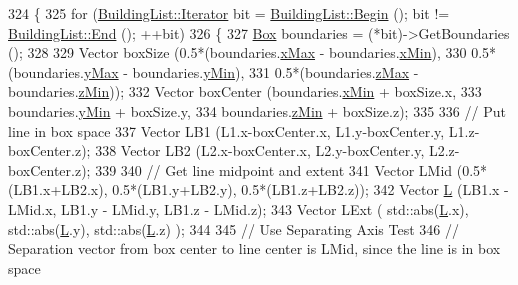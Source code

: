 \begin{DoxyCode}
324 \{
325         \textcolor{keywordflow}{for} (\hyperlink{classns3_1_1BuildingList_a84957ecea4b4343f676da0e96f2c8130}{BuildingList::Iterator} bit = 
      \hyperlink{classns3_1_1BuildingList_adbb122872e11541e930f0a3afa70a479}{BuildingList::Begin} (); bit != \hyperlink{classns3_1_1BuildingList_abc6b941dbb194efb9f00352cc6b3db65}{BuildingList::End} (); ++bit)
326         \{
327                 \hyperlink{classns3_1_1Box}{Box} boundaries = (*bit)->GetBoundaries ();
328 
329                 Vector boxSize (0.5*(boundaries.\hyperlink{classns3_1_1Box_a50021049c756e770329145b25d9533a2}{xMax} - boundaries.\hyperlink{classns3_1_1Box_a1fd6a43d53258323331d34da600ff1c5}{xMin}),
330                                 0.5*(boundaries.\hyperlink{classns3_1_1Box_a001fd430a14b19efe925c818a332e392}{yMax} - boundaries.\hyperlink{classns3_1_1Box_a3865ed092f941186823539c9979002f8}{yMin}),
331                                 0.5*(boundaries.\hyperlink{classns3_1_1Box_ae4d135764bbc8421fe82ec91e4693b59}{zMax} - boundaries.\hyperlink{classns3_1_1Box_a9ab297b877a5c31dbfb344bd6f027e91}{zMin}));
332                 Vector boxCenter (boundaries.\hyperlink{classns3_1_1Box_a1fd6a43d53258323331d34da600ff1c5}{xMin} + boxSize.x,
333                                 boundaries.\hyperlink{classns3_1_1Box_a3865ed092f941186823539c9979002f8}{yMin} + boxSize.y,
334                                 boundaries.\hyperlink{classns3_1_1Box_a9ab297b877a5c31dbfb344bd6f027e91}{zMin} + boxSize.z);
335 
336                 \textcolor{comment}{// Put line in box space}
337                 Vector LB1 (L1.x-boxCenter.x, L1.y-boxCenter.y, L1.z-boxCenter.z);
338                 Vector LB2 (L2.x-boxCenter.x, L2.y-boxCenter.y, L2.z-boxCenter.z);
339 
340                 \textcolor{comment}{// Get line midpoint and extent}
341                 Vector LMid (0.5*(LB1.x+LB2.x), 0.5*(LB1.y+LB2.y), 0.5*(LB1.z+LB2.z));
342                 Vector \hyperlink{loss__ITU1411__NLOS__over__rooftop_8m_a0f93e2c2e7c447b4dfc5bcac7e346da1}{L} (LB1.x - LMid.x, LB1.y - LMid.y, LB1.z - LMid.z);
343                 Vector LExt ( std::abs(\hyperlink{loss__ITU1411__NLOS__over__rooftop_8m_a0f93e2c2e7c447b4dfc5bcac7e346da1}{L}.x), std::abs(\hyperlink{loss__ITU1411__NLOS__over__rooftop_8m_a0f93e2c2e7c447b4dfc5bcac7e346da1}{L}.y), std::abs(\hyperlink{loss__ITU1411__NLOS__over__rooftop_8m_a0f93e2c2e7c447b4dfc5bcac7e346da1}{L}.z) );
344 
345                 \textcolor{comment}{// Use Separating Axis Test}
346                 \textcolor{comment}{// Separation vector from box center to line center is LMid, since the line is in box space}

\end{DoxyCode}

